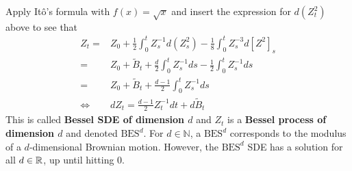 \documentclass[12pt,a4paper]{article}
\begin{document}
Apply It\^o's formula with $f(x) = \sqrt{x}$ and insert the expression for $d(Z_t^2)$ above to see that 
\begin{align*}
Z_t =& Z_0 + \frac{1}{2} \int_0^t Z_s^{-1} d(Z_s^2) - \frac{1}{8} \int_0^t Z_s^{-3} d[Z^2]_s  \\
=& Z_0 + \tilde{B}_t + \frac{d}{2} \int_0^t Z_s^{-1} ds - \frac{1}{2} \int_0^t Z_s^{-1} ds \\
=& Z_0 + \tilde{B}_t + \frac{d-1}{2}\int_0^t Z_s^{-1} ds \\
\Leftrightarrow \quad & dZ_t = \frac{d-1}{2} Z_t^{-1} dt + d\tilde{B}_t 
\end{align*}
This is called \textbf{Bessel SDE of dimension $d$} and $Z_t$ is a \textbf{Bessel process of dimension $d$} and denoted $\text{BES}^d$. For $d\in \mathbb{N}$, a $\text{BES}^d$ corresponds to the modulus of a $d$-dimensional Brownian motion. However, the $\text{BES}^d$ SDE has a solution for all $d\in \mathbb{R}$, up until hitting 0.
\s
\end{document}
